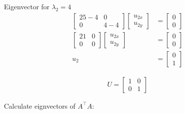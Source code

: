 \documentclass[11pt,letterpaper]{article}
\begin{document}
\begin{enumerate}
Eigenvector for \( \lambda_2 = 4 \)
\begin{align*}
    \begin{bmatrix}
        25-4 & 0 \\
        0 & 4-4
    \end{bmatrix}
    \begin{bmatrix}
        u_{2x} \\ u_{2y}
    \end{bmatrix}
    &= \begin{bmatrix}
        0 \\ 0
    \end{bmatrix} \\
    \begin{bmatrix}
        21 & 0 \\
        0 & 0
    \end{bmatrix}
    \begin{bmatrix}
        u_{2x} \\ u_{2y}
    \end{bmatrix}
    &= \begin{bmatrix}
        0 \\ 0
    \end{bmatrix} \\
    u_2
    &= \begin{bmatrix}
        0 \\ 1
    \end{bmatrix}
\end{align*}

\begin{align*}
U = {\begin{bmatrix}
        1 & 0 \\
        0 & 1
    \end{bmatrix}}
\end{align*}

Calculate eignvectors of \( A^\top A \):


\end{enumerate}
\end{document}
